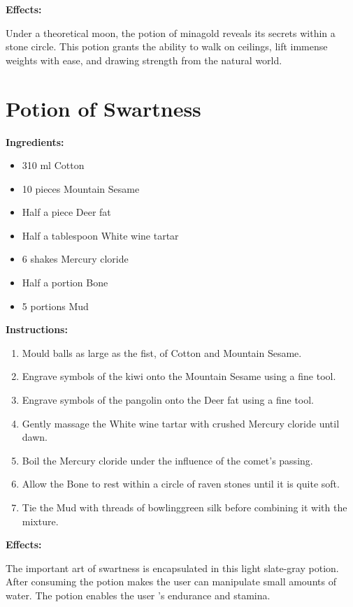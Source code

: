 \documentclass{article}
\begin{document}
\textbf{Effects:}

Under a theoretical moon, the potion of minagold reveals its secrets within a stone circle. This potion grants the ability to walk on ceilings, lift immense weights with ease, and drawing strength from the natural world.

\newpage
\section*{Potion of Swartness}

\textbf{Ingredients:}

\begin{itemize}
  \item 310 ml Cotton
  \item 10 pieces Mountain Sesame
  \item Half a piece Deer fat
  \item Half a tablespoon White wine tartar
  \item 6 shakes Mercury cloride
  \item Half a portion Bone
  \item 5 portions Mud
\end{itemize}

\textbf{Instructions:}

\begin{enumerate}
  \item Mould balls as large as the fist, of Cotton and Mountain Sesame.
  \item Engrave symbols of the kiwi onto the Mountain Sesame using a fine tool.
  \item Engrave symbols of the pangolin onto the Deer fat using a fine tool.
  \item Gently massage the White wine tartar with crushed Mercury cloride until dawn.
  \item Boil the Mercury cloride under the influence of the comet’s passing.
  \item Allow the Bone to rest within a circle of raven stones until it is quite soft.
  \item Tie the Mud with threads of bowlinggreen silk before combining it with the mixture.
\end{enumerate}

\textbf{Effects:}

The important art of swartness is encapsulated in this light slate-gray potion. After consuming the potion makes the user can manipulate small amounts of water. The potion enables the user 's endurance and stamina.
\end{document}
